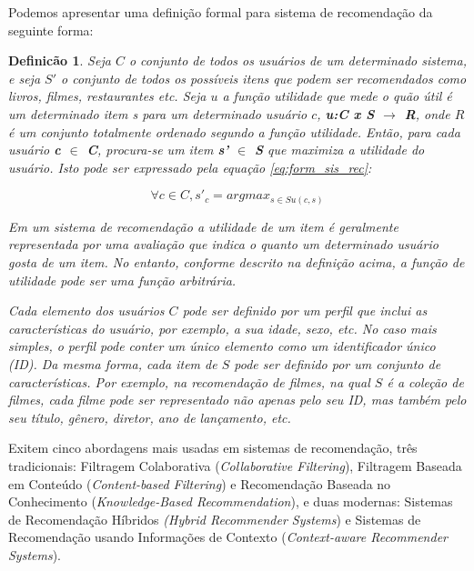 Podemos apresentar uma definição formal para sistema de recomendação da seguinte forma: 

\newtheorem{mydef}{Definicão}
\begin{mydef}
	Seja $C$ o conjunto de todos os usuários de um determinado sistema, e seja $S'$ o conjunto de todos os possíveis itens que podem ser recomendados como livros, filmes, restaurantes etc. Seja $u$ a função utilidade que mede o quão útil é um determinado item s para um determinado usuário $c$, \textbf{\textit{u}:C x S $\rightarrow$ R}, onde $R$ é um conjunto totalmente ordenado segundo a função utilidade. Então, para cada usuário \textbf{\textit{c} $\in$ C}, procura-se um item \textbf{\textit{s'} $\in$ S} que maximiza a utilidade do usuário. Isto pode ser expressado pela equação \ref{eq:form_sis_rec}:
	
	\begin{equation}
	\label{eq:form_sis_rec}
	\forall c \in C, s'_{c} = argmax_{s \in S u(c, s)}
	\end{equation}
	
	Em um sistema de recomendação a utilidade de um item é geralmente representada por uma avaliação que indica o quanto um determinado usuário gosta de um item. No entanto, conforme descrito na definição acima, a função de utilidade pode ser uma função arbitrária.
	
	Cada elemento dos usuários $C$ pode ser definido por um perfil que inclui as características do usuário, por exemplo, a sua idade, sexo, etc. No caso mais simples, o perfil pode conter um único elemento como um identificador único (ID). Da mesma forma, cada item de $S$ pode ser definido por um conjunto de características. Por exemplo, na recomendação de filmes, na qual $S$ é a coleção de filmes, cada filme pode ser representado não apenas pelo seu ID, mas também pelo seu título, gênero, diretor, ano de lançamento, etc.
\end{mydef}

Exitem cinco abordagens mais usadas em sistemas de recomendação, três tradicionais: Filtragem Colaborativa (\textit{Collaborative Filtering}), Filtragem Baseada em Conteúdo (\textit{Content-based Filtering}) e Recomendação Baseada no Conhecimento (\textit{Knowledge-Based Recommendation}), e duas modernas: Sistemas de Recomendação Híbridos \textit{(Hybrid Recommender Systems}) e Sistemas de Recomendação usando Informações de Contexto (\textit{Context-aware Recommender Systems}).

